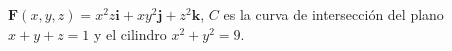 \item $\mathbf{F}(x, y, z) = x^2z \mathbf{i} + xy^2 \mathbf{j} + z^2 \mathbf{k}$, $C$ es la curva de intersección del plano $x + y + z = 1$ y el cilindro $x^2 + y^2 = 9$.
